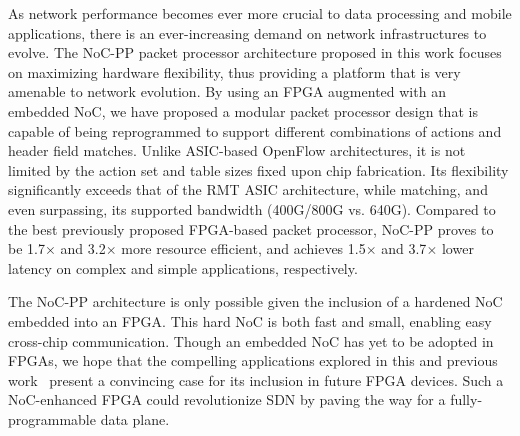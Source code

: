 %
%
%
%


As network performance becomes ever more crucial to data processing and mobile applications, there is an ever-increasing demand on network infrastructures to evolve.
The NoC-PP packet processor architecture proposed in this work focuses on maximizing hardware flexibility, thus providing a platform that is very amenable to network evolution.
By using an FPGA augmented with an embedded NoC, we have proposed a modular packet processor design that is capable of being reprogrammed to support different combinations of actions and header field matches.
Unlike ASIC-based OpenFlow architectures, it is not limited by the action set and table sizes fixed upon chip fabrication.
Its flexibility significantly exceeds that of the RMT ASIC architecture, while matching, and even surpassing, its supported bandwidth (400G/800G vs. 640G).
Compared to the best previously proposed FPGA-based packet processor, NoC-PP proves to be 1.7$\times$ and 3.2$\times$ more resource efficient, and achieves 1.5$\times$ and 3.7$\times$ lower latency on complex and simple applications, respectively.

The NoC-PP architecture is only possible given the inclusion of a hardened NoC embedded into an FPGA.
This hard NoC is both fast and small, enabling easy cross-chip communication.
Though an embedded NoC has yet to be adopted in FPGAs, we hope that the compelling applications explored in this and previous work~\cite{abdelfattah2015take,bitar2014efficient} present a convincing case for its inclusion in future FPGA devices.
Such a NoC-enhanced FPGA could revolutionize SDN by paving the way for a fully-programmable data plane.
